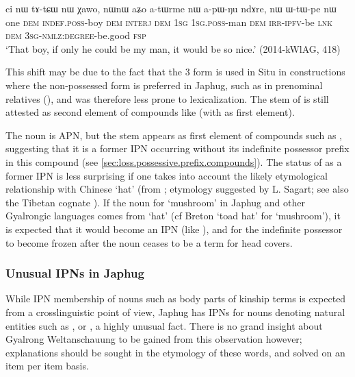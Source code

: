 \begin{exe}
\ex \label{ex:atWrme}
\gll ci nɯ tɤ-tɕɯ nɯ χawo, nɯnɯ aʑo a-tɯrme nɯ a-pɯ-ŋu ndɤre, nɯ ɯ-tɯ-pe nɯ\\
one \textsc{dem} \textsc{indef}.\textsc{poss}-boy \textsc{dem} \textsc{interj} \textsc{dem} \textsc{1sg} \textsc{1sg.poss}-man \textsc{dem} \textsc{irr}-\textsc{ipfv}-be \textsc{lnk} \textsc{dem} \textsc{3sg}-\textsc{nmlz}:\textsc{degree}-be.good \textsc{fsp} \\
\glt `That boy, if only he could be my man, it would be so nice.' (2014-kWlAG, 418)
\end{exe}

This shift may be due to the fact that the 3\sg{} form is used in Situ in constructions where the non-possessed form is preferred in Japhug, such as in prenominal relatives (\citealt[190]{lin09phd}), and was therefore less prone to lexicalization. The stem  of   is still attested as second element of compounds like  (with  as first element).  

The noun  is APN, but the stem  appears as first element of compounds such as , suggesting that it is a former IPN occurring without its indefinite possessor prefix in this compound (see \ref{sec:loss.possessive.prefix.compounds}). The status of  as a former IPN is less surprising if one takes into account the likely etymological relationship with Chinese   `hat' (from ; etymology suggested by L. Sagart; see also the Tibetan cognate ).  If the noun for `mushroom' in Japhug and other Gyalrongic languages comes from `hat' (cf Breton  `toad hat' for `mushroom'), it is expected that it would become an IPN (like ), and for the indefinite possessor  to become frozen after the noun ceases to be a term for head covers.
 
\subsubsection{Unusual IPNs in Japhug} \label{sec:earth.IPN}
While IPN membership of nouns such as body parts of kinship terms is expected from a crosslinguistic point of view, Japhug has IPNs for nouns denoting natural entities such as ,  or , a highly unusual fact. There is no grand insight about Gyalrong Weltanschauung to be gained from this observation however; explanations should be sought in the etymology of these words, and solved on an item per item basis.  

